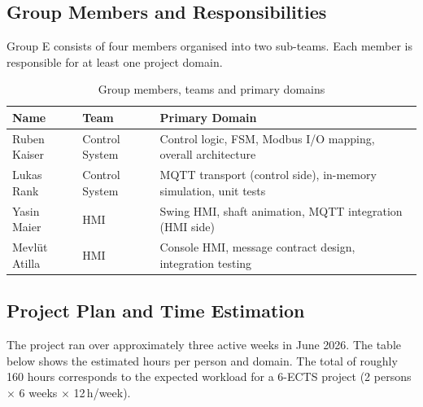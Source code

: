 \documentclass[12pt,a4paper]{article}
\begin{document}
\subsection{Group Members and Responsibilities}

Group E consists of four members organised into two sub-teams.
Each member is responsible for at least one project domain.

\begin{table}[H]
\centering
\begin{tabularx}{\textwidth}{llX}
\toprule
\textbf{Name} & \textbf{Team} & \textbf{Primary Domain} \\
\midrule
Ruben Kaiser      & Control System & Control logic, FSM, Modbus I/O mapping, overall architecture \\
Lukas Rank        & Control System & MQTT transport (control side), in-memory simulation, unit tests \\
Yasin Maier       & HMI            & Swing HMI, shaft animation, MQTT integration (HMI side) \\
Mevl\"{u}t Atilla & HMI           & Console HMI, message contract design, integration testing \\
\bottomrule
\end{tabularx}
\caption{Group members, teams and primary domains}
\end{table}

\subsection{Project Plan and Time Estimation}

The project ran over approximately three active weeks in June 2026.
The table below shows the estimated hours per person and domain.
The total of roughly 160 hours corresponds to the expected workload
for a 6-ECTS project (2 persons $\times$ 6 weeks $\times$ 12\,h/week).
\end{document}
